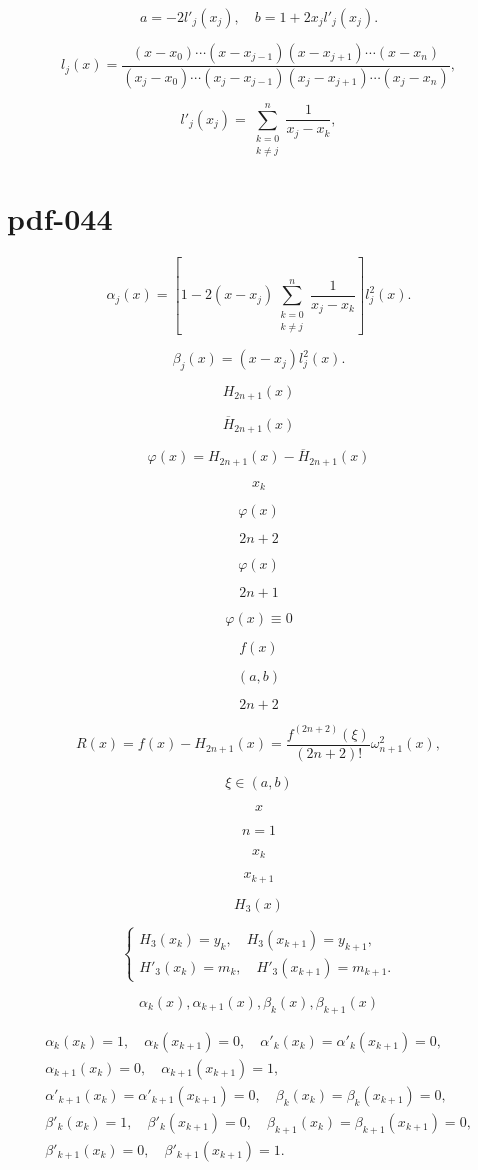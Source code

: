 \documentclass[fontset=fandol]{ctexart}
\begin{document}
\[a=-2l'_j(x_j),\quad b=1+2x_jl'_j(x_j).\]

\[l_j(x)=\frac{(x-x_0)\cdots(x-x_{j-1})(x-x_{j+1})\cdots(x-x_n)}{(x_j-x_0)\cdots(x_j-x_{j-1})(x_j-x_{j+1})\cdots(x_j-x_n)},\]

\[l'_j(x_j)=\sum_{\substack{k=0\\k\ne j}}^{n}\frac{1}{x_j-x_k},\]

\section*{pdf-044}

\[\alpha_j(x)=\left[1-2(x-x_j)\sum_{\substack{k=0\\k\ne j}}^n\frac{1}{x_j-x_k}\right]l_j^2(x).\tag{2.6.4}\]

\[\beta_j(x)=(x-x_j)l_j^2(x).\tag{2.6.5}\]

\[H_{2n+1}(x)\]

\[\overline H_{2n+1}(x)\]

\[\varphi(x)=H_{2n+1}(x)-\overline H_{2n+1}(x)\]

\[x_k\]

\[\varphi(x)\]

\[2n+2\]

\[\varphi(x)\]

\[2n+1\]

\[\varphi(x)\equiv0\]

\[f(x)\]

\[(a,b)\]

\[2n+2\]

\[R(x)=f(x)-H_{2n+1}(x)=\frac{f^{(2n+2)}(\xi)}{(2n+2)!}\omega_{n+1}^2(x),\tag{2.6.6}\]

\[\xi\in(a,b)\]

\[x\]

\[n=1\]

\[x_k\]

\[x_{k+1}\]

\[H_3(x)\]

\[\begin{cases}
H_3(x_k)=y_k,\quad H_3(x_{k+1})=y_{k+1},\\
H'_3(x_k)=m_k,\quad H'_3(x_{k+1})=m_{k+1}.
\end{cases}\tag{2.6.7}\]

\[\alpha_k(x),\alpha_{k+1}(x),\beta_k(x),\beta_{k+1}(x)\]

\[\begin{gathered}
\alpha_k(x_k)=1,\quad\alpha_k(x_{k+1})=0,\quad\alpha'_k(x_k)=\alpha'_k(x_{k+1})=0,\\
\alpha_{k+1}(x_k)=0,\quad\alpha_{k+1}(x_{k+1})=1,\\
\alpha'_{k+1}(x_k)=\alpha'_{k+1}(x_{k+1})=0,\quad\beta_k(x_k)=\beta_k(x_{k+1})=0,\\
\beta'_k(x_k)=1,\quad\beta'_k(x_{k+1})=0,\quad\beta_{k+1}(x_k)=\beta_{k+1}(x_{k+1})=0,\\
\beta'_{k+1}(x_k)=0,\quad\beta'_{k+1}(x_{k+1})=1.
\end{gathered}\]
\end{document}
